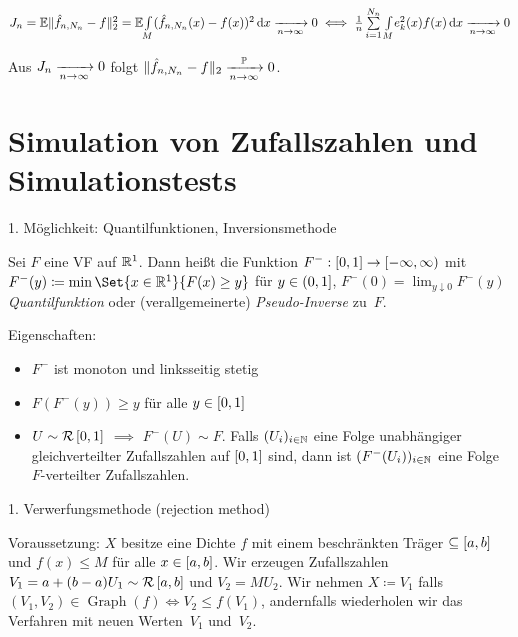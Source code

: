 \documentclass{cheat-sheet}
\renewcommand{\P}{\mathbb{P}} %
\newcommand{\E}{\mathbb{E}} %
\newcommand{\Uniform}{\mathcal{R}} %
\DeclareMathOperator{\Graph}{Graph} %
\begin{document}

\begin{satz}
  $J_n = \E \norm{\hat{f}_{n,N_n} - f}_2^2 = \E \AInt{M}{(\hat{f}_{n,N_n}(x) - f(x))^2}{x} \xra[n \to \infty]{} 0 \iff \tfrac{1}{n} \sum_{i=1}^{N_n} \AInt{M}{e_k^2(x) f(x)}{x} \xra[n \to \infty]{} 0$
\end{satz}

\begin{kor}
  Aus $J_n \xrightarrow[n \to \infty]{} 0$ folgt $\norm{\hat{f}_{n,N_n} - f}_2 \xra[n \to \infty]{\P} 0$.
\end{kor}

\section{Simulation von Zufallszahlen und Simulationstests}


1. Möglichkeit: Quantilfunktionen, Inversionsmethode

Sei $F$ eine VF auf $\mathbb{R}^1$.
Dann heißt die Funktion $F^{-} : \left[ 0, 1 \right] \to \left[ -\infty, \infty \right)$ mit $F^{-}(y) \coloneqq \min \Set{x \in \R^1}{F(x) \geq y}$ für $y \in \left( 0, 1 \right]$, $F^{-}(0) = \lim_{y \downarrow 0} F^{-}(y)$ \emph{Quantilfunktion} oder (verallgemeinerte) \emph{Pseudo-Inverse} zu~$F$.

Eigenschaften:

\begin{itemize}
  \item $F^{-}$ ist monoton und linksseitig stetig
  \item $F(F^{-}(y)) \geq y$ für alle $y \in \left[ 0, 1 \right]$
  \item $U \sim \Uniform \cinterval{0}{1}$ $\implies$ $F^{-}(U) \sim F$.
  Falls $(U_i)_{i \in \mathbb{N}}$ eine Folge unabhängiger gleichverteilter Zufallszahlen auf $\left[ 0, 1 \right]$ sind, dann ist $(F^{-}(U_i))_{i \in \mathbb{N}}$ eine Folge $F$-verteilter Zufallszahlen.
\end{itemize}


1. Verwerfungsmethode (rejection method)

Voraussetzung: $X$ besitze eine Dichte $f$ mit einem beschränkten Träger $\subseteq \left[ a, b \right]$ und $f(x) \leq M$ für alle $x \in \left[ a, b \right]$.
Wir erzeugen Zufallszahlen $V_1 = a + (b-a) U_1 \sim \Uniform \cinterval{a}{b}$ und $V_2 = M U_2$.
Wir nehmen $X \coloneqq V_1$ falls $(V_1, V_2) \in \Graph(f) \iff V_2 \leq f(V_1)$, andernfalls wiederholen wir das Verfahren mit neuen Werten~$V_1$ und~$V_2$.
\end{document}
